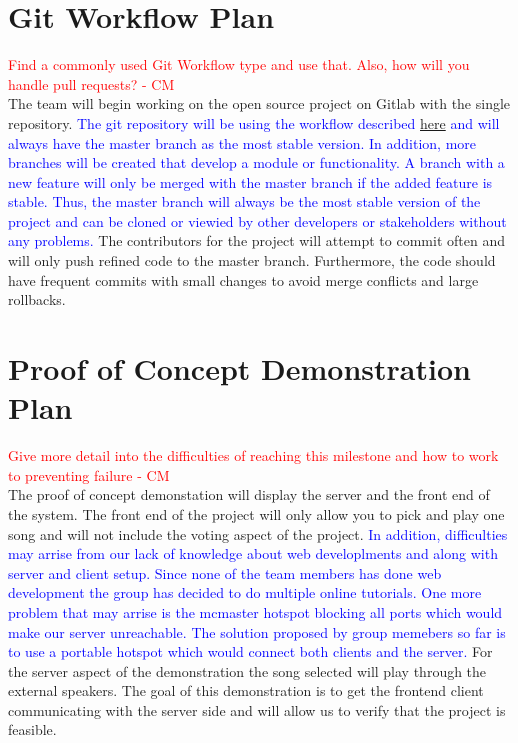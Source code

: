 \documentclass{article}
\begin{document}
\section{Git Workflow Plan}
\textcolor{red}{Find a commonly used Git Workflow type and use that. Also, how will you handle pull requests?  - CM} \\
The team will begin working on the open source project on Gitlab with the single repository.
\textcolor{blue}{
The git repository will be using the workflow described \href{https://git-scm.com/book/en/v2/Git-Branching-Branching-Workflows}{here} and will always have the master branch as the most stable version. In addition, more branches will be created that develop a module or functionality. A branch with a new feature will only be merged with the master branch if the added feature is stable. Thus, the master branch will always be the most stable version of the project and can be cloned or viewied by other developers or stakeholders without any problems. } The contributors for the project will attempt to commit often and will only push refined code to the master branch. Furthermore, the code should have frequent commits with small changes to avoid merge conflicts and large rollbacks.
\section{Proof of Concept Demonstration Plan}
\textcolor{red}{Give more detail into the difficulties of reaching this milestone and how to work to preventing failure  - CM} \\
The proof of concept demonstation will display the server and the front end of the system. The front end of the project will only allow you to pick and play one song and will not include the voting aspect of the project.\textcolor{blue}{ In addition, difficulties may arrise from our lack of knowledge about web developlments and along with server and client setup. Since none of the team members has done web development the group has decided to do multiple online tutorials. One more problem that may arrise is the mcmaster hotspot blocking all ports which would make our server unreachable. The solution proposed by group memebers so far is to use a portable hotspot which would connect both clients and the server.} For the server aspect of the demonstration the song selected will play through the external speakers. The goal of this demonstration is to get the frontend client communicating with the server side and will allow us to verify that the project is feasible.
\end{document}
